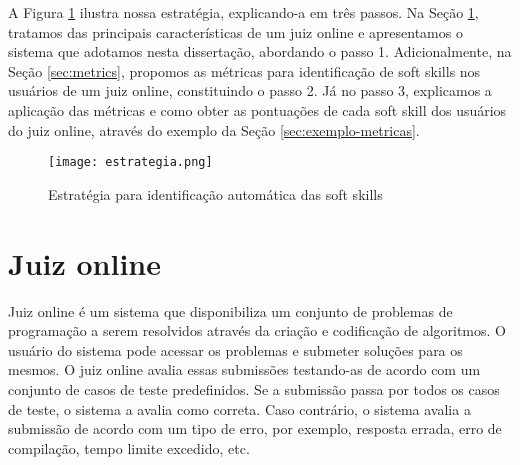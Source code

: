 

A Figura \ref{fig:estrategia} ilustra nossa estratégia, explicando-a em três passos.
Na Seção \ref{sec:huxley}, tratamos das principais características de um juiz online e apresentamos o sistema que adotamos nesta dissertação, abordando o passo 1. Adicionalmente, na Seção \ref{sec:metrics}, propomos as métricas para identificação de soft skills nos usuários de um juiz online, constituindo o passo 2. Já no passo 3, explicamos a aplicação das métricas e como obter as pontuações de cada soft skill dos usuários do juiz online, através do exemplo da Seção \ref{sec:exemplo-metricas}.

\begin{figure}[ht]
\centering
\caption{\small Estratégia para identificação automática das soft skills} 
\texttt{[image: estrategia.png]}
\label{fig:estrategia}
\end{figure}

\section{Juiz online} 
\label{sec:huxley}

Juiz online é um sistema que disponibiliza um conjunto de problemas de programação a serem resolvidos através da criação e codificação de algoritmos. O usuário do sistema pode acessar os problemas e submeter soluções para os mesmos. O juiz online avalia essas submissões testando-as de acordo com um conjunto de casos de teste predefinidos. Se a submissão passa por todos os casos de teste, o sistema a avalia como correta. Caso contrário, o sistema avalia a submissão de acordo com um tipo de erro, por exemplo, resposta errada, erro de compilação, tempo limite excedido, etc.

